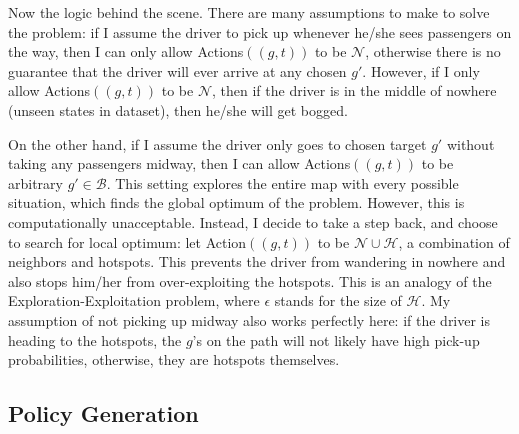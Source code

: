 \documentclass[letterpaper, 10 pt, conference]{ieeeconf}
\begin{document}
Now the logic behind the scene. There are many assumptions to make to solve the problem: if I assume the driver to pick up whenever he/she sees passengers on the way, then I can only allow Actions$((g,t))$ to be $\mathcal{N}$, otherwise there is no guarantee that the driver will ever arrive at any chosen $g'$. However, if I only allow Actions$((g,t))$ to be $\mathcal{N}$, then if the driver is in the middle of nowhere (unseen states in dataset), then he/she will get bogged. 

On the other hand, if I assume the driver only goes to chosen target $g'$ without taking any passengers midway, then I can allow Actions$((g,t))$ to be arbitrary $g'\in\mathcal{B}$. This setting explores the entire map with every possible situation, which finds the global optimum of the problem. However, this is computationally unacceptable. Instead, I decide to take a step back, and choose to search for local optimum: let Action$((g,t))$ to be $\mathcal{N}\cup\mathcal{H}$, a combination of neighbors and hotspots. This prevents the driver from wandering in nowhere and also stops him/her from over-exploiting the hotspots. This is an analogy of the Exploration-Exploitation problem, where $\epsilon$ stands for the size of $\mathcal{H}$. My assumption of not picking up midway also works perfectly here: if the driver is heading to the hotspots, the $g$'s on the path will not likely have high pick-up probabilities, otherwise, they are hotspots themselves.
\subsection{Policy Generation}
\end{document}
